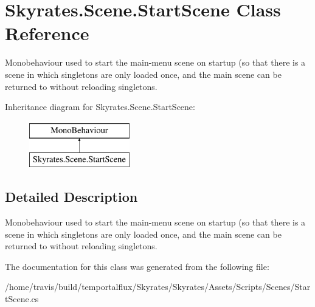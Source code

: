 \hypertarget{class_skyrates_1_1_scene_1_1_start_scene}{\section{Skyrates.\-Scene.\-Start\-Scene Class Reference}
\label{class_skyrates_1_1_scene_1_1_start_scene}
}


Monobehaviour used to start the main-\/menu scene on startup (so that there is a scene in which singletons are only loaded once, and the main scene can be returned to without reloading singletons.  


Inheritance diagram for Skyrates.\-Scene.\-Start\-Scene\-:\begin{figure}[H]
\begin{center}
\leavevmode
\includegraphics[height=2.000000cm]{class_skyrates_1_1_scene_1_1_start_scene}
\end{center}
\end{figure}


\subsection{Detailed Description}
Monobehaviour used to start the main-\/menu scene on startup (so that there is a scene in which singletons are only loaded once, and the main scene can be returned to without reloading singletons. 



The documentation for this class was generated from the following file\-:\begin{DoxyCompactItemize}
\item 
/home/travis/build/temportalflux/\-Skyrates/\-Skyrates/\-Assets/\-Scripts/\-Scenes/Start\-Scene.\-cs\end{DoxyCompactItemize}
